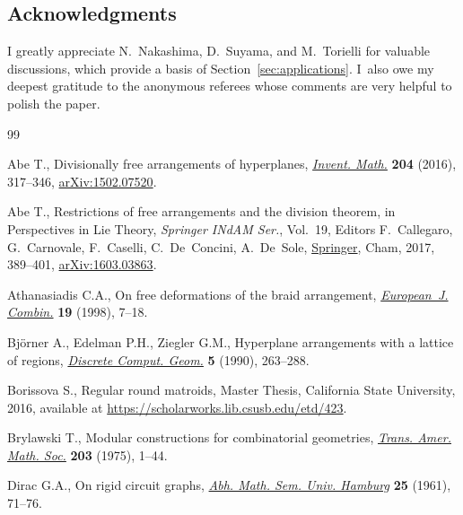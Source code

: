 \documentclass[pdftex]{sigma}
\numberwithin{equation}{section}
\begin{document}
\subsection*{Acknowledgments}
I greatly appreciate N.~Nakashima, D.~Suyama, and M.~Torielli for valuable discussions, which provide a basis of Section~\ref{sec:applications}. I~also owe my deepest gratitude to the anonymous referees whose comments are very helpful to polish the paper.

\begin{thebibliography}{99}
\footnotesize\itemsep=0pt

Abe T., Divisionally free arrangements of hyperplanes, \href{https://doi.org/10.1007/s00222-015-0615-7}{\textit{Invent. Math.}}
 \textbf{204} (2016), 317--346, \href{https://arxiv.org/abs/1502.07520}{arXiv:1502.07520}.

Abe T., Restrictions of free arrangements and the division theorem, in
 Perspectives in {L}ie Theory, \textit{Springer INdAM Ser.}, Vol.~19, Editors
 F.~Callegaro, G.~Carnovale, F.~Caselli, C.~De~Concini, A.~De~Sole, \href{https://doi.org/10.1007/978-3-319-58971-8_14}{Springer},
 Cham, 2017, 389--401, \href{https://arxiv.org/abs/1603.03863}{arXiv:1603.03863}.

Athanasiadis C.A., On free deformations of the braid arrangement,
 \href{https://doi.org/10.1006/eujc.1997.0149}{\textit{European~J. Combin.}} \textbf{19} (1998), 7--18.

Bj\"orner A., Edelman P.H., Ziegler G.M., Hyperplane arrangements with a
 lattice of regions, \href{https://doi.org/10.1007/BF02187790}{\textit{Discrete Comput. Geom.}} \textbf{5} (1990),
 263--288.

Borissova S., Regular round matroids, {M}aster Thesis, California State
 University, 2016, available at
 \url{https://scholarworks.lib.csusb.edu/etd/423}.

Brylawski T., Modular constructions for combinatorial geometries,
 \href{https://doi.org/10.2307/1997065}{\textit{Trans. Amer. Math. Soc.}} \textbf{203} (1975), 1--44.

Dirac G.A., On rigid circuit graphs, \href{https://doi.org/10.1007/BF02992776}{\textit{Abh. Math. Sem. Univ. Hamburg}}
 \textbf{25} (1961), 71--76.


\end{thebibliography}
\end{document}
